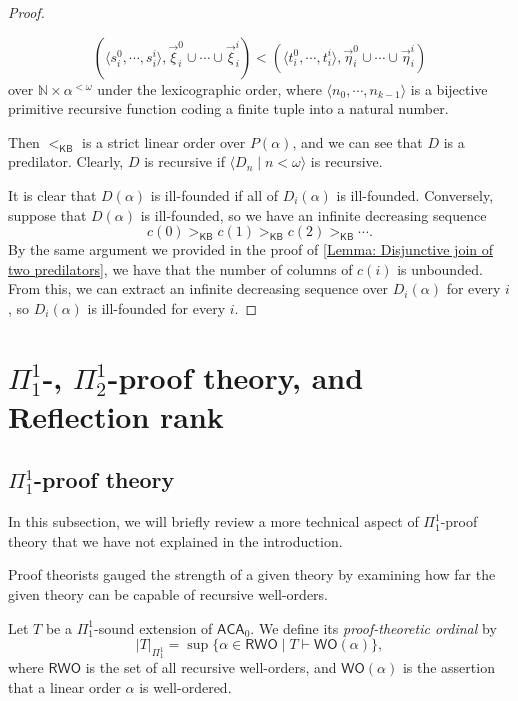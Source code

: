 \documentclass{mhkr}
\newcommand{\lag}{\langle}
\newcommand{\rag}{\rangle}
\newcommand{\bbN}{\mathbb{N}}
\newcommand{\WO}{\mathsf{WO}}
\newcommand{\KB}{\mathsf{KB}}
\newcommand{\ACA}{\mathsf{ACA}}
\begin{document}
\begin{proof}
\begin{enumerate}
        \begin{equation*}
            (\lag s^0_i,\cdots,s^i_i\rag, \vec{\xi}^0_i\cup \cdots \cup \vec{\xi}^i_i) < (\lag t^0_i,\cdots,t^i_i\rag, \vec{\eta}^0_i\cup \cdots \cup \vec{\eta}^i_i)
        \end{equation*}
        over $\bbN\times \alpha^{<\omega}$ under the lexicographic order, where $\lag n_0,\cdots,n_{k-1}\rag$ is a bijective primitive recursive function coding a finite tuple into a natural number.        
    \end{enumerate}
    Then $<_\KB$ is a strict linear order over $P(\alpha)$, and we can see that $D$ is a predilator. Clearly, $D$ is recursive if $\lag D_n\mid n<\omega\rag$ is recursive. 

    It is clear that $D(\alpha)$ is ill-founded if all of $D_i(\alpha)$ is ill-founded. Conversely, suppose that $D(\alpha)$ is ill-founded, so we have an infinite decreasing sequence
    \begin{equation*}
        c(0) >_\KB c(1) >_\KB c(2) >_\KB \cdots.
    \end{equation*}
    By the same argument we provided in the proof of \autoref{Lemma: Disjunctive join of two predilators}, we have that the number of columns of $c(i)$ is unbounded. From this, we can extract an infinite decreasing sequence over $D_i(\alpha)$ for every $i$, so $D_i(\alpha)$ is ill-founded for every $i$.
\end{proof}

\section{\texorpdfstring{$\Pi^1_1$-}{Pi 1 1-}, \texorpdfstring{$\Pi^1_2$-}{Pi 1 2-}proof theory, and Reflection rank}
\label{Section: Pi 1 1 and Pi 1 2}

\subsection{\texorpdfstring{$\Pi^1_1$}{Pi 1 1}-proof theory}
In this subsection, we will briefly review a more technical aspect of $\Pi^1_1$-proof theory that we have not explained in the introduction. 

Proof theorists gauged the strength of a given theory by examining how far the given theory can be capable of recursive well-orders. 
\begin{definition}
    Let $T$ be a $\Pi^1_1$-sound extension of $\ACA_0$. We define its \emph{proof-theoretic ordinal} by
    \begin{equation*}
        |T|_{\Pi^1_1} = \sup\{\alpha\in \mathsf{RWO} \mid T\vdash\WO(\alpha)\},
    \end{equation*}
    where $\mathsf{RWO}$ is the set of all recursive well-orders, and $\WO(\alpha)$ is the assertion that a linear order $\alpha$ is well-ordered.
\end{definition}
\end{document}
